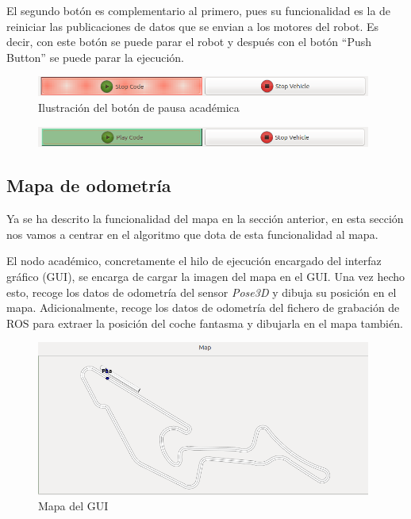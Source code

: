 El segundo botón es complementario al primero, pues su funcionalidad es la de reiniciar las publicaciones de datos que se envian a los motores del robot. Es decir, con este botón se puede parar el robot y después con el botón ``Push Button'' se puede parar la ejecución.

\begin{figure}[H]
	\begin{center}
	    \includegraphics[width=0.98\textwidth]{figures/boton_pausa_chrono.png}
		\caption{Ilustración del botón de pausa académica}
		\label{fig.bpch}
	\end{center}
\end{figure}
\begin{figure}[H]
	\begin{center}
        \includegraphics[width=0.98\textwidth]{figures/boton_start_chrono.png}
		\label{fig:bsch}
	\end{center}
\end{figure}


\subsection{Mapa de odometría}
Ya se ha descrito la funcionalidad del mapa en la sección anterior, en esta sección nos vamos a centrar en el algoritmo que dota de esta funcionalidad al mapa.

El nodo académico, concretamente el hilo de ejecución encargado del interfaz gráfico (GUI), se encarga de cargar la imagen del mapa en el GUI. Una vez hecho esto, recoge los datos de odometría del sensor \textit{Pose3D} y dibuja su posición en el mapa. Adicionalmente, recoge los datos de odometría del fichero de grabación de ROS para extraer la posición del coche fantasma y dibujarla en el mapa también.

\begin{figure}[H]
  \begin{center}
    \includegraphics[width=0.98\textwidth]{figures/mapa_chrono.png}
		\caption{Mapa del GUI}
		\label{fig.mapach}
		\end{center}
\end{figure}

